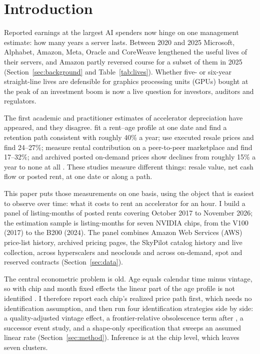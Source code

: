 \section{Introduction}
\label{sec:intro}

Reported earnings at the largest AI spenders now hinge on one management estimate: how many years
a server lasts. Between 2020 and 2025 Microsoft, Alphabet, Amazon, Meta, Oracle and CoreWeave
lengthened the useful lives of their servers, and Amazon partly reversed course for a subset of
them in 2025 (Section~\ref{sec:background} and Table~\ref{tab:lives}). Whether five- or six-year
straight-line lives are defensible for graphics processing units (GPUs) bought at the peak of an
investment boom is now a live question for investors, auditors and regulators.

The first academic and practitioner estimates of accelerator depreciation have appeared, and they
disagree. \citet{amissahocran2026collateral} fit a rent--age profile at one date and find a
retention path consistent with roughly 40\% a year; \citet{chincholikar2026economic} use executed
resale prices and find 24--27\%; \citet{huang2026gpu} measure rental contribution on a
peer-to-peer marketplace and find 17--32\%; and archived posted on-demand prices show declines
from roughly 15\% a year to none at all \citep{ccir2026rental}. These studies measure different
things: resale value, net cash flow or posted rent, at one date or along a path.

This paper puts those measurements on one basis, using the object that is easiest to observe
over time: what it costs to rent an accelerator for an hour. I build a panel of \nPanelRows{}
listing-months of posted rents covering October 2017 to November 2026; the estimation sample is
\nSampleRows{} listing-months for seven NVIDIA chips, from the V100 (2017) to the B200 (2024). The
panel combines Amazon Web Services (AWS) price-list history,
archived pricing pages, the SkyPilot catalog history and live collection, across hyperscalers and
neoclouds and across on-demand, spot and reserved contracts (Section~\ref{sec:data}).

The central econometric problem is old. Age equals calendar time minus vintage, so with chip and
month fixed effects the linear part of the age profile is not identified \citep{hall1968technical}.
I therefore report each chip's realized price path first, which needs no identification
assumption, and then run four identification strategies side by side: a quality-adjusted vintage effect, a frontier-relative obsolescence term
after \citet{geske2007computers}, a successor event study, and a shape-only specification that
sweeps an assumed linear rate (Section~\ref{sec:method}). Inference is at the chip level, which
leaves seven clusters.

